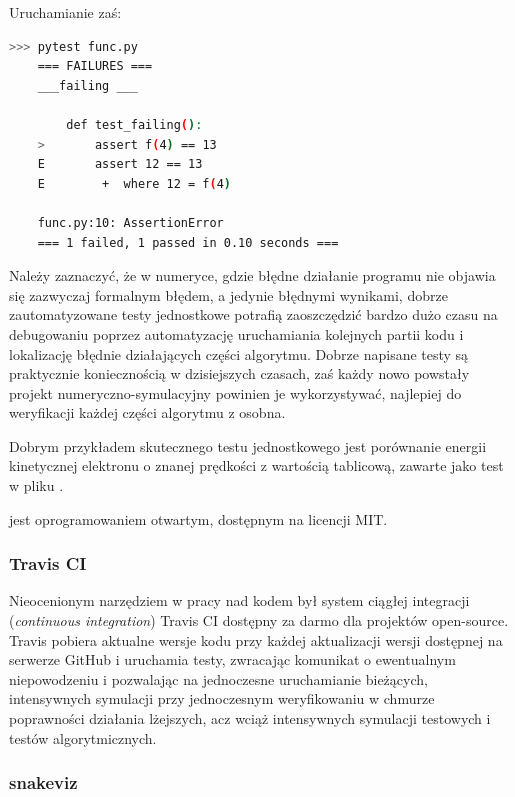 

Uruchamianie zaś:

\begin{lstlisting}[language=Bash]
    >>> pytest func.py
    === FAILURES ===
    ___failing ___

        def test_failing():
    >       assert f(4) == 13
    E       assert 12 == 13
    E        +  where 12 = f(4)

    func.py:10: AssertionError
    === 1 failed, 1 passed in 0.10 seconds ===
\end{lstlisting}

Należy zaznaczyć, że w numeryce, gdzie błędne działanie programu nie
objawia się zazwyczaj formalnym błędem, a jedynie błędnymi
wynikami, dobrze zautomatyzowane testy jednostkowe potrafią zaoszczędzić
bardzo dużo czasu na debugowaniu poprzez automatyzację uruchamiania
kolejnych partii kodu i lokalizację błędnie działających części algorytmu.
Dobrze napisane testy są praktycznie koniecznością w dzisiejszych czasach,
zaś każdy nowo powstały projekt numeryczno-symulacyjny powinien je
wykorzystywać, najlepiej do weryfikacji każdej części algorytmu z osobna.

Dobrym przykładem skutecznego testu jednostkowego jest porównanie energii kinetycznej
elektronu o znanej prędkości z wartością tablicową, zawarte jako test w pliku
.

 jest oprogramowaniem otwartym, dostępnym na licencji MIT.

\subsubsection{Travis CI}
Nieocenionym narzędziem w pracy nad kodem był system ciągłej integracji
(\emph{continuous integration}) Travis CI \cite{travisci}
dostępny za
darmo dla projektów open-source. Travis pobiera aktualne wersje kodu przy
każdej aktualizacji wersji dostępnej na serwerze GitHub i uruchamia testy,
zwracając komunikat o ewentualnym niepowodzeniu i pozwalając na jednoczesne
uruchamianie bieżących, intensywnych symulacji przy jednoczesnym
weryfikowaniu w chmurze poprawności działania lżejszych, acz wciąż intensywnych
symulacji testowych i testów algorytmicznych.

\subsubsection{snakeviz}

